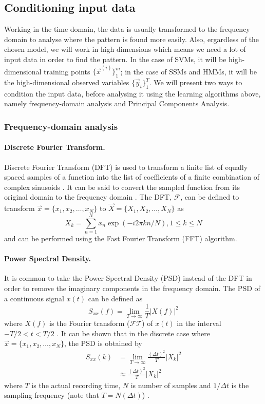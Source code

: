 \subsection{Conditioning input data}
\label{sec:conditioning-ta}
	Working in the time domain, the data is usually transformed to the frequency domain to analyse where the pattern is found more easily. Also, ergardless of the chosen model, we will work in high dimensions which means we need a lot of input data in order to find the pattern. In the case of SVMs, it will be high-dimensional training points $\{\vec x^{(i)}\}_1^m$; in the case of SSMs and HMMs, it will be the high-dimensional observed variables $\{\vec y_t\}_1^T$. We will present two ways to condition the input data, before analysing it using the learning algorithms above, namely frequency-domain analysis and Principal Components Analysis.
	
	\subsubsection{Frequency-domain analysis}
		\paragraph{Discrete Fourier Transform.}
			Discrete Fourier Transform (DFT) is used to transform a finite list of equally spaced samples of a function into the list of coefficients of a finite combination of complex sinusoids \cite{wiki:DFT}. It can be said to convert the sampled function from its original domain to the frequency domain \cite{wiki:DFT}. The DFT, $\mathcal{F}$, can be defined to transform $\vec x = \{x_1, x_2, \dotsc, x_{N}\}$ to $\vec X = \{X_1, X_2, \dotsc, X_{N}\}$ as
			\begin{equation}
				X_k = \sum_{n = 1}^{N} x_n \exp{(-i2\pi k n / N)}, 1 \leq k \leq N
			\end{equation}
			and can be performed using the Fast Fourier Transform (FFT) algorithm.

		\paragraph{Power Spectral Density.}
			It is common to take the Power Spectral Density (PSD) instead of the DFT in order to remove the imaginary components in the frequency domain. The PSD of a continuous signal $x(t)$ can be defined as
			\begin{equation}
				S_{xx}(f) = \lim_{T \to \infty} \frac{1}{T} \left| X(f) \right|^2
			\end{equation}
			where $X(f)$ is the Fourier transform ($\mathcal{FT}$) of $x(t)$ in the interval $-T / 2 < t < T / 2$ \cite{hlt}. It can be shown that in the discrete case where $\vec x = \{x_1, x_2, \dotsc, x_{N}\}$, the PSD is obtained by
			\begin{align}
				S_{xx}(k) 	&= \lim_{T \to \infty} \frac{(\Delta t)^2}{T} |X_k|^2\\
							&\approx \frac{(\Delta t)^2}{T} |X_k|^2
			\end{align}
			where $T$ is the actual recording time, $N$ is number of samples and $1/\Delta t$ is the sampling frequency (note that $T = N(\Delta t)$) \cite{wiki:PSD}.


